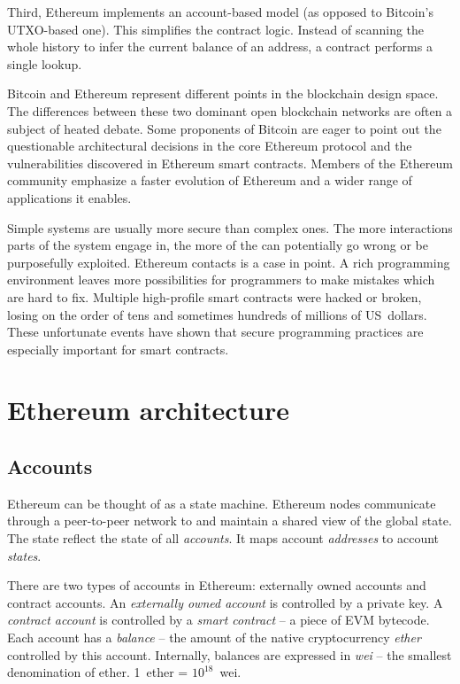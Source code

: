 Third, Ethereum implements an account-based model (as opposed to Bitcoin's UTXO-based one).
This simplifies the contract logic.
Instead of scanning the whole history to infer the current balance of an address, a contract performs a single lookup.

Bitcoin and Ethereum represent different points in the blockchain design space.
The differences between these two dominant open blockchain networks are often a subject of heated debate.
Some proponents of Bitcoin are eager to point out the questionable architectural decisions in the core Ethereum protocol and the vulnerabilities discovered in Ethereum smart contracts.
Members of the Ethereum community emphasize a faster evolution of Ethereum and a wider range of applications it enables.

Simple systems are usually more secure than complex ones.
The more interactions parts of the system engage in, the more of the can potentially go wrong or be purposefully exploited.
Ethereum contacts is a case in point.
A rich programming environment leaves more possibilities for programmers to make mistakes which are hard to fix.
Multiple high-profile smart contracts were hacked or broken, losing on the order of tens and sometimes hundreds of millions of US~dollars.
These unfortunate events have shown that secure programming practices are especially important for smart contracts.


\section{Ethereum architecture}

\subsection{Accounts}

Ethereum can be thought of as a state machine.
Ethereum nodes communicate through a peer-to-peer network to and maintain a shared view of the global state.
The state reflect the state of all \textit{accounts}.
It maps account \textit{addresses} to account \textit{states}.

There are two types of accounts in Ethereum: externally owned accounts and contract accounts.
An \textit{externally owned account} is controlled by a private key.
A \textit{contract account} is controlled by a \textit{smart contract} -- a piece of EVM bytecode.
Each account has a \textit{balance} -- the amount of the native cryptocurrency \textit{ether} controlled by this account.
Internally, balances are expressed in \textit{wei} -- the smallest denomination of ether.
1~ether = $10^{18}$~wei.

